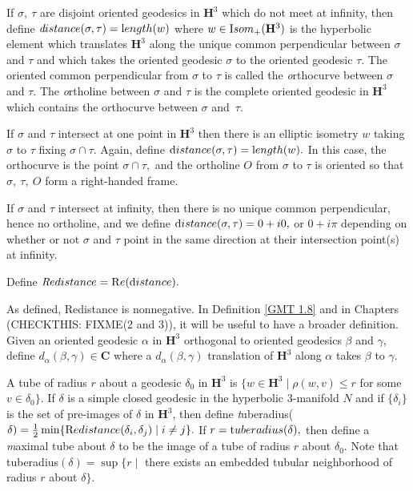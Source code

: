 \begin{definition}\label{GMT 1.4} 
  If $\sigma,\ \tau$ are disjoint oriented geodesics  in 
${\mathbf H}^3$ which do not meet at infinity,
then define
${\textit distance}(\sigma,\tau)={\textrm length}(w)$ where 
$w\in {\textrm Isom}_+({\mathbf H}^3)$ is the hyperbolic
element which translates ${\mathbf H}^3$
along the unique common perpendicular between $\sigma$ and $\tau$ and which takes the
oriented geodesic $\sigma$ to the
oriented geodesic $\tau$.  The oriented common perpendicular from $\sigma$ to $\tau$ is
called the {\textit orthocurve} between $\sigma$
and $\tau$.  The {\textit ortholine} between $\sigma$ and $\tau$ is the complete oriented
geodesic in ${\mathbf H}^3$ which contains the
orthocurve between $\sigma$ and~$\tau$.

If $\sigma$ and $\tau$ intersect at one point in ${\mathbf H}^3$ then 
there is an elliptic isometry $w$ taking $\sigma$ to $\tau$ fixing $\sigma \cap \tau.$  Again,  define ${\textrm distance}(\sigma, \tau) = {\textrm length}(w).$  In this case, the orthocurve is the point $\sigma \cap \tau,$ and the ortholine $O$ from $\sigma$ to $\tau$ is oriented
so that $\sigma,\ \tau,\ O$ form a right-handed frame.

If $\sigma$ and $\tau$ intersect at infinity, then there is no unique common perpendicular, hence no ortholine, and we define
${\textrm distance}(\sigma,\tau) = 0 + i0,$ or $0 + i\pi$ depending on whether or not $\sigma$ and $\tau$ point in the same direction at their intersection point(s) at infinity.

Define ${\textit Redistance} = {\mathrm Re} ({\textrm distance}).$

As defined, Redistance is nonnegative.
In Definition \ref{GMT 1.8} and in Chapters (CHECKTHIS: FIXME(2 and 3)),
it will be useful to have a broader definition. Given an oriented
geodesic $\alpha$ in ${\mathbf H}^3$ orthogonal to oriented geodesics $\beta$ and $\gamma$, define $d_\alpha(\beta,\gamma) \in {\mathbf C}$ where a
$d_\alpha(\beta,\gamma)$ translation of ${\mathbf H}^3$  along $\alpha$ takes $\beta$ to $\gamma.$
\end{definition}


\begin{definition} \label{GMT 1.6}
A tube of radius $r$ about a geodesic $\delta_0$ in ${\mathbf H}^3$ is 
$\{w \in {\mathbf H}^3 \mid \rho(w, v) \le r$ for some $v \in \delta_0 \}.$    
If $\delta$
is a simple closed geodesic in the hyperbolic $3$-manifold $N$ and if
$\{\delta_i \}$ is the set of pre-images of $\delta$ in ${\mathbf H}^3$, then define
{\textit tuberadius}($\delta)={1 \over 2} \min 
\{{\textrm Redistance}(\delta_i,\delta_j) \mid i\neq j \}.$
If $r = {\textrm tuberadius}(\delta),$ 
then define a {\textit maximal tube} about $\delta$ to be the
image of a tube of radius $r$ about $\delta_0.$  Note that
tuberadius$(\delta)=
\sup\{r \mid $ there exists an embedded tubular neighborhood of
radius $r$ about $\delta \}.$
\end{definition}


